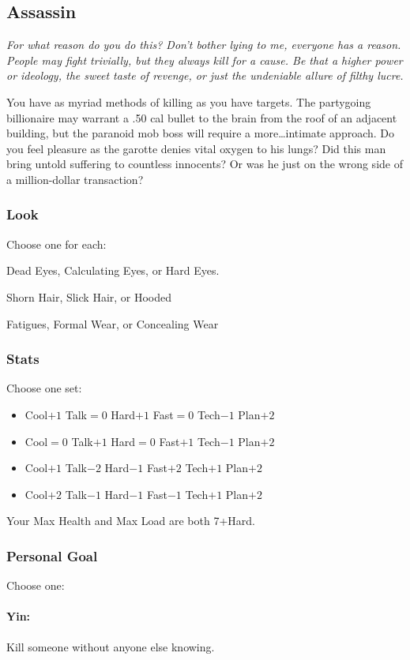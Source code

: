 \subsection{Assassin}
{\itshape For what reason do you do this? Don't bother lying to me,
  everyone has a reason. People may fight trivially, but they always
  kill for a cause. Be that a higher power or ideology, the sweet
  taste of revenge, or just the undeniable allure of filthy lucre.

You have as myriad methods of killing as you have targets. The
partygoing billionaire may warrant a .50 cal bullet to the brain from
the roof of an adjacent building, but the paranoid mob boss will
require a more\ldots intimate approach. Do you feel pleasure as the
garotte denies vital oxygen to his lungs? Did this man bring untold
suffering to countless innocents? Or was he just on the wrong side of
a million-dollar transaction?}

\subsubsection{Look}
Choose one for each:

Dead Eyes, Calculating Eyes, or Hard Eyes.

Shorn Hair, Slick Hair, or Hooded

Fatigues, Formal Wear, or Concealing Wear

\subsubsection{Stats}
Choose one set:
\begin{itemize}
\setlength\itemsep{0em}
\item Cool$+1$ Talk${=}0$ Hard$+1$ Fast${=}0$ Tech$-1$ Plan$+2$
\item Cool${=}0$ Talk$+1$ Hard${=}0$ Fast$+1$ Tech$-1$ Plan$+2$
\item Cool$+1$ Talk$-2$ Hard$-1$ Fast$+2$ Tech$+1$ Plan$+2$
\item Cool$+2$ Talk$-1$ Hard$-1$ Fast$-1$ Tech$+1$ Plan$+2$
\end{itemize}

Your Max Health and Max Load are both 7+Hard.

\subsubsection{Personal Goal}
Choose one:
\paragraph{Yin:} Kill someone without anyone else knowing.
